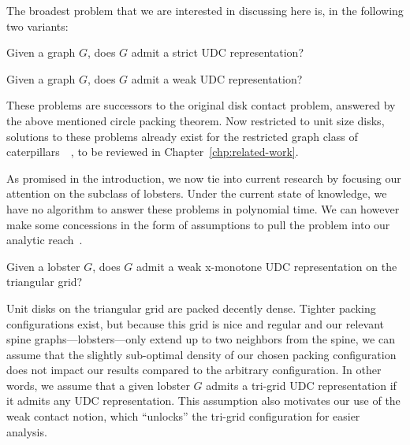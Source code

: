 The broadest problem that we are interested in discussing here is, in the following two variants:

\begin{problem}
Given a graph $G$, does $G$ admit a strict UDC representation?
\label{prob:strict-udc}
\end{problem}

\begin{problem}
Given a graph $G$, does $G$ admit a weak UDC representation?
\label{prob:weak-udc}
\end{problem}

These problems are successors to the original disk contact problem, answered by the above mentioned circle packing theorem. Now restricted to unit size disks, solutions to these problems already exist for the restricted graph class of caterpillars~\cite{Klemz2015}~\cite{Cleve2020}, to be reviewed in Chapter~\ref{chp:related-work}.

As promised in the introduction, we now tie into current research by focusing our attention on the subclass of lobsters. Under the current state of knowledge, we have no algorithm to answer these problems in polynomial time. We can however make some concessions in the form of assumptions to pull the problem into our analytic reach~\cite{Bhore2021}.

\begin{problem}
Given a lobster $G$, does $G$ admit a weak x-monotone UDC representation on the triangular grid?
\label{prob:weak-udc-lobster}
\end{problem}

Unit disks on the triangular grid are packed decently dense. Tighter packing configurations exist, but because this grid is nice and regular and our relevant spine graphs---lobsters---only extend up to two neighbors from the spine, we can assume that the slightly sub-optimal density of our chosen packing configuration does not impact our results compared to the arbitrary configuration. In other words, we assume that a given lobster $G$ admits a tri-grid UDC representation if it admits any UDC representation. This assumption also motivates our use of the weak contact notion, which ``unlocks'' the tri-grid configuration for easier analysis.


